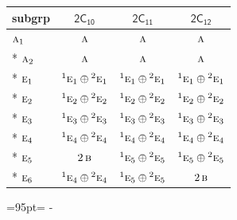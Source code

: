 \documentclass[10pt,a4paper]{article}
\newcommand{\needspace}[1]{\par\penalty-100\begingroup\dimen0=#1\relax\dimen2=\pagegoal
  \advance\dimen2-\pagetotal\ifdim\dimen0>\dimen2\relax\ifdim\dimen2>0pt\vfil\break\fi\fi
  \endgroup}
\numberwithin{equation}{section}
\newcommand{\grp}[1]{\mathsf{#1}}
\newcommand{\irr}[1]{\text{\normalfont\scshape #1}}
\newcommand{\conjpair}[1]{{}^{#1}}
\begin{document}
{\small\begin{longtable}{@{}lccc@{}}\toprule
subgrp & \href{2C10.pdf}{$\grp{2C_{10}}$} & \href{2C11.pdf}{$\grp{2C_{11}}$} & \href{2C12.pdf}{$\grp{2C_{12}}$}\\\midrule\endhead
\bottomrule\endfoot\endlastfoot
$\irr{a}_{1}$ & $\irr{a}$ & $\irr{a}$ & $\irr{a}$\\*
$\irr{a}_{2}$ & $\irr{a}$ & $\irr{a}$ & $\irr{a}$\\*
$\irr{e}_{1}$ & $\conjpair{1}\irr{e}_{1}\oplus \conjpair{2}\irr{e}_{1}$ & $\conjpair{1}\irr{e}_{1}\oplus \conjpair{2}\irr{e}_{1}$ & $\conjpair{1}\irr{e}_{1}\oplus \conjpair{2}\irr{e}_{1}$\\*
$\irr{e}_{2}$ & $\conjpair{1}\irr{e}_{2}\oplus \conjpair{2}\irr{e}_{2}$ & $\conjpair{1}\irr{e}_{2}\oplus \conjpair{2}\irr{e}_{2}$ & $\conjpair{1}\irr{e}_{2}\oplus \conjpair{2}\irr{e}_{2}$\\*
$\irr{e}_{3}$ & $\conjpair{1}\irr{e}_{3}\oplus \conjpair{2}\irr{e}_{3}$ & $\conjpair{1}\irr{e}_{3}\oplus \conjpair{2}\irr{e}_{3}$ & $\conjpair{1}\irr{e}_{3}\oplus \conjpair{2}\irr{e}_{3}$\\*
$\irr{e}_{4}$ & $\conjpair{1}\irr{e}_{4}\oplus \conjpair{2}\irr{e}_{4}$ & $\conjpair{1}\irr{e}_{4}\oplus \conjpair{2}\irr{e}_{4}$ & $\conjpair{1}\irr{e}_{4}\oplus \conjpair{2}\irr{e}_{4}$\\*
$\irr{e}_{5}$ & $2\,\irr{b}$ & $\conjpair{1}\irr{e}_{5}\oplus \conjpair{2}\irr{e}_{5}$ & $\conjpair{1}\irr{e}_{5}\oplus \conjpair{2}\irr{e}_{5}$\\*
$\irr{e}_{6}$ & $\conjpair{1}\irr{e}_{4}\oplus \conjpair{2}\irr{e}_{4}$ & $\conjpair{1}\irr{e}_{5}\oplus \conjpair{2}\irr{e}_{5}$ & $2\,\irr{b}$\\
\bottomrule\end{longtable}}

\needspace{95pt}
\end{document}
